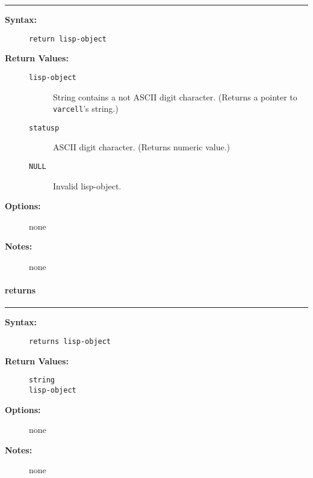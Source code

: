 \hrule
\begin{description}
\item[{\bf Syntax:}] \mbox{}

{\tt return lisp-object}

\item[{\bf Return Values:}] \mbox{}

\begin{description}
\item[{\tt lisp-object}] \mbox{}

String contains a not ASCII digit character.    
(Returns a pointer to {\tt varcell}'s string.)

\item[{\tt statusp}] \mbox{}

ASCII digit character. (Returns numeric value.)

\item[{\tt NULL}] \mbox{}

Invalid lisp-object.

\end{description}


\item[{\bf Options:}] \mbox{}

none  

\item[{\bf Notes:}] \mbox{}

none  

\end{description}


\vspace {2pt}


\paragraph{returns}

\hrule
\begin{description}
\item[{\bf Syntax:}] \mbox{}

{\tt returns lisp-object}

\item[{\bf Return Values:}] \mbox{}

\begin{description}
\item[{\tt string}] \mbox{}



\item[{\tt lisp-object}] \mbox{}



\end{description}


\item[{\bf Options:}] \mbox{}

none  

\item[{\bf Notes:}] \mbox{}

none

\end{description}


